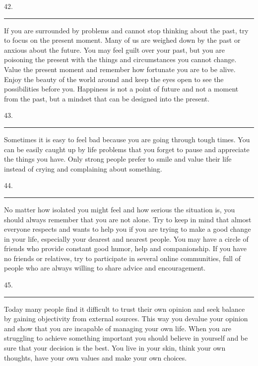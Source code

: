 \documentclass[UTF8,11pt]{ctexart}
\begin{document}
42. \par\noindent\rule{.95\linewidth}{.4pt}\par


If you are surrounded by problems and cannot stop thinking about the past, try to focus on the present moment. Many of us are weighed down by the past or anxious about the future. You may feel guilt over your past, but you are poisoning the present with the things and circumstances you cannot change. Value the present moment and remember how fortunate you are to be alive. Enjoy the beauty of the world around and keep the eyes open to see the possibilities before you. Happiness is not a point of future and not a moment from the past, but a mindset that can be designed into the present.


43. \par\noindent\rule{.95\linewidth}{.4pt}\par


Sometimes it is easy to feel bad because you are going through tough times. You can be easily caught up by life problems that you forget to pause and appreciate the things you have. Only strong people prefer to smile and value their life instead of crying and complaining about something.


44. \par\noindent\rule{.95\linewidth}{.4pt}\par


No matter how isolated you might feel and how serious the situation is, you should always remember that you are not alone. Try to keep in mind that almost everyone respects and wants to help you if you are trying to make a good change in your life, especially your dearest and nearest people. You may have a circle of friends who provide constant good humor, help and companionship. If you have no friends or relatives, try to participate in several online communities, full of people who are always willing to share advice and encouragement.


45. \par\noindent\rule{.95\linewidth}{.4pt}\par


Today many people find it difficult to trust their own opinion and seek balance by gaining objectivity from external sources. This way you devalue your opinion and show that you are incapable of managing your own life. When you are struggling to achieve something important you should believe in yourself and be sure that your decision is the best. You live in your skin, think your own thoughts, have your own values and make your own choices.
\end{document}
